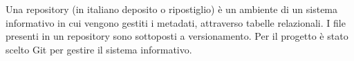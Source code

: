 
{Una repository (in italiano deposito o ripostiglio) è un ambiente di un sistema informativo in cui vengono gestiti i metadati, attraverso tabelle relazionali. I file presenti in un repository sono sottoposti a versionamento. Per il progetto è stato scelto Git per gestire il sistema informativo.}

